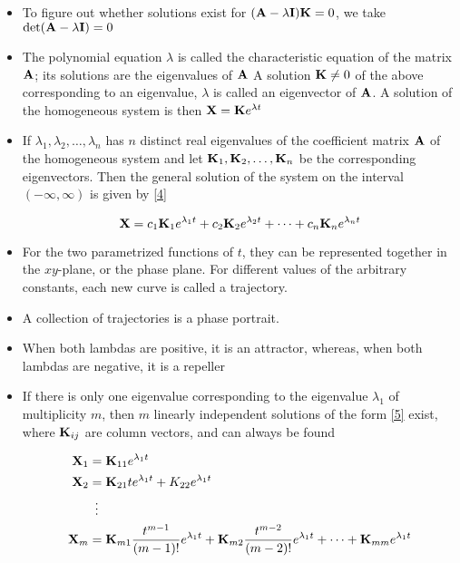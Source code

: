 \documentclass[12pt]{article}
\begin{document}
\begin{itemize}
  \item To figure out whether solutions exist for $(\bold{A}-\lambda\bold{I})\bold{K}=0$, we take $\det(\bold{A}-\lambda\bold{I})=0$

  \item The polynomial equation $\lambda$ is called the characteristic equation of the matrix $\bold{A}$; its solutions are the eigenvalues of $\bold{A}$ A solution $\bold{K}\neq0$ of the above corresponding to an eigenvalue, $\lambda$ is called an eigenvector of $\bold{A}$. A solution of the homogeneous system is then $\bold{X}=\bold{K}e^{\lambda t}$

  \item If $\lambda_1,\lambda_2,\dots,\lambda_n$ has $n$ distinct real eigenvalues of the coefficient matrix $\bold{A}$ of the homogeneous system and let $\bold{K}_1,\bold{K}_2,\dots,\bold{K}_n$ be the corresponding eigenvectors. Then the general solution of the system on the interval $(-\infty,\infty)$ is given by \eqref{4}

    \begin{equation}
      \bold{X}=c_1\bold{K}_1e^{\lambda_1t}+c_2\bold{K}_2e^{\lambda_2 t}+\dots+c_n\bold{K}_ne^{\lambda_nt}
      \label{4}
    \end{equation}

  \item For the two parametrized functions of $t$, they can be represented together in the $xy$-plane, or the phase plane. For different values of the arbitrary constants, each new curve is called a trajectory.

  \item A collection of trajectories is a phase portrait.

  \item When both lambdas are positive, it is an attractor, whereas, when both lambdas are negative, it is a repeller

  \item If there is only one eigenvalue corresponding to the eigenvalue $\lambda_1$ of multiplicity $m$, then $m$ linearly independent solutions of the form \eqref{5} exist, where $\bold{K}_{ij}$ are column vectors, and can always be found

    \begin{equation}
      \begin{split}
        \bold{X}_1&=\bold{K}_{11}e^{\lambda_1t}\\
        \bold{X}_2&=\bold{K}_{21}te^{\lambda_1t}+K_{22}e^{\lambda_1t}\\
        &\hspace{5pt}\vdots\\
        \bold{X}_m&=\bold{K}_{m1}\frac{t^{m-1}}{(m-1)!}e^{\lambda_1t}+\bold{K}_{m2}\frac{t^{m-2}}{(m-2)!}e^{\lambda_1t}+\dots+\bold{K}_{mm}e^{\lambda_1t}\\
      \end{split}
      \label{5}
    \end{equation}


\end{itemize}
\end{document}
